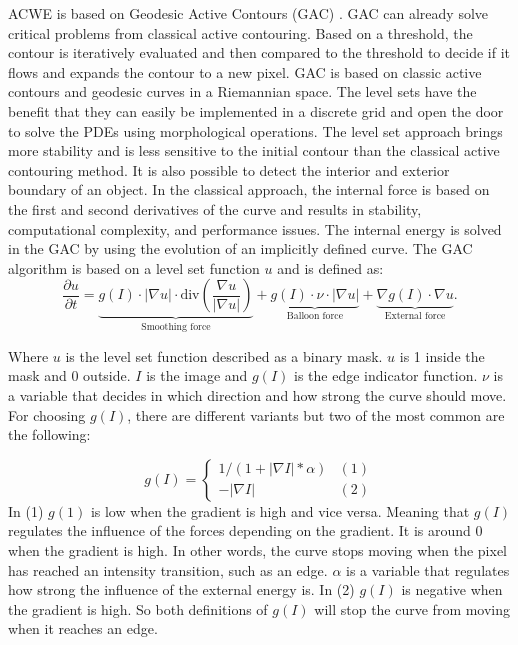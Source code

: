 ACWE is based on Geodesic Active Contours (GAC) \cite{}. GAC can already solve critical problems from classical active contouring. Based on a threshold, the contour is iteratively evaluated and then compared to the threshold to decide if it flows and expands the contour to a new pixel. GAC is based on classic active contours and geodesic curves in a Riemannian space. The level sets have the benefit that they can easily be implemented in a discrete grid and open the door to solve the PDEs using morphological operations. The level set approach brings more stability and is less sensitive to the initial contour than the classical active contouring method. It is also possible to detect the interior and exterior boundary of an object. In the classical approach, the internal force is based on the first and second derivatives of the curve and results in stability, computational complexity, and performance issues. The internal energy is solved in the GAC by using the evolution of an implicitly defined curve. The GAC algorithm is based on a level set function $u$ and is defined as:
\begin{equation}
    \frac{\partial u}{\partial t} = 
    \underbrace{g(I) \cdot |\nabla u| \cdot \text{div} \left(\frac{\nabla u}{|\nabla u|}\right)}_{\text{Smoothing force}} 
    + \underbrace{g(I) \cdot \nu \cdot |\nabla u|}_{\text{Balloon force}} 
    + \underbrace{\nabla g(I) \cdot \nabla u}_{\text{External force}}.
    \label{deform}
    \end{equation}
    
Where $u$ is the level set function described as a binary mask. $u$ is 1 inside the mask and 0 outside. $I$ is the image and $g(I)$ is the edge indicator function. $\nu$ is a variable that decides in which direction and how strong the curve should move. 
For choosing $g(I)$, there are different variants but two of the most common are the following: 

\begin{equation}
    g(I) = \begin{cases}
     1/(1 + |\nabla I|*\alpha) &(1)\\
     -|\nabla I| &(2)
    \end{cases}
\end{equation}
In (1) $g(1)$ is low when the gradient is high and vice versa. Meaning that $g(I)$ regulates the influence of the forces depending on the gradient. It is around 0 when the gradient is high. In other words, the curve stops moving when the pixel has reached an intensity transition, such as an edge. $\alpha$ is a variable that regulates how strong the influence of the external energy is. In (2) $g(I)$ is negative when the gradient is high. So both definitions of $g(I)$ will stop the curve from moving when it reaches an edge.

